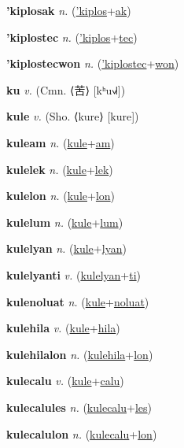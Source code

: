 \textbf{\hypertarget{'kiplosak}{'kiplosak}} \textit{n.} (\hyperlink{'kiplos}{'kiplos}+\allowbreak \hyperlink{ak}{ak})


\textbf{\hypertarget{'kiplostec}{'kiplostec}} \textit{n.} (\hyperlink{'kiplos}{'kiplos}+\allowbreak \hyperlink{tec}{tec})


\textbf{\hypertarget{'kiplostecwon}{'kiplostecwon}} \textit{n.} (\hyperlink{'kiplostec}{'kiplostec}+\allowbreak \hyperlink{won}{won})


\textbf{\hypertarget{ku}{ku}} \textit{v.} (Cmn. ⟨{\chinese{}苦}⟩ [kʰu˧˩˧])


\textbf{\hypertarget{kule}{kule}} \textit{v.} (Sho. ⟨kure⟩ [kure])


\textbf{\hypertarget{kuleam}{kuleam}} \textit{n.} (\hyperlink{kule}{kule}+\allowbreak \hyperlink{am}{am})


\textbf{\hypertarget{kulelek}{kulelek}} \textit{n.} (\hyperlink{kule}{kule}+\allowbreak \hyperlink{lek}{lek})


\textbf{\hypertarget{kulelon}{kulelon}} \textit{n.} (\hyperlink{kule}{kule}+\allowbreak \hyperlink{lon}{lon})


\textbf{\hypertarget{kulelum}{kulelum}} \textit{n.} (\hyperlink{kule}{kule}+\allowbreak \hyperlink{lum}{lum})


\textbf{\hypertarget{kulelyan}{kulelyan}} \textit{n.} (\hyperlink{kule}{kule}+\allowbreak \hyperlink{lyan}{lyan})


\textbf{\hypertarget{kulelyanti}{kulelyanti}} \textit{v.} (\hyperlink{kulelyan}{kulelyan}+\allowbreak \hyperlink{ti}{ti})


\textbf{\hypertarget{kulenoluat}{kulenoluat}} \textit{n.} (\hyperlink{kule}{kule}+\allowbreak \hyperlink{noluat}{noluat})


\textbf{\hypertarget{kulehila}{kulehila}} \textit{v.} (\hyperlink{kule}{kule}+\allowbreak \hyperlink{hila}{hila})


\textbf{\hypertarget{kulehilalon}{kulehilalon}} \textit{n.} (\hyperlink{kulehila}{kulehila}+\allowbreak \hyperlink{lon}{lon})


\textbf{\hypertarget{kulecalu}{kulecalu}} \textit{v.} (\hyperlink{kule}{kule}+\allowbreak \hyperlink{calu}{calu})


\textbf{\hypertarget{kulecalules}{kulecalules}} \textit{n.} (\hyperlink{kulecalu}{kulecalu}+\allowbreak \hyperlink{les}{les})


\textbf{\hypertarget{kulecalulon}{kulecalulon}} \textit{n.} (\hyperlink{kulecalu}{kulecalu}+\allowbreak \hyperlink{lon}{lon})


